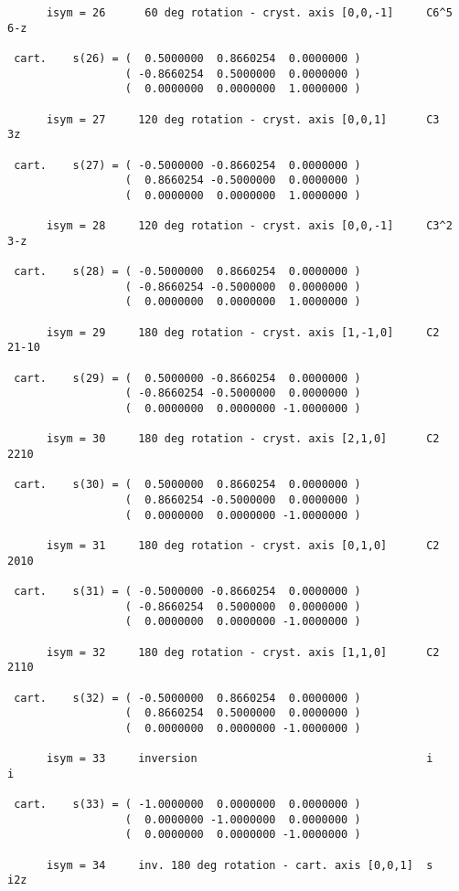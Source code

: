 \documentclass[12pt,a4paper]{article}
\begin{document}
\begin{footnotesize}
\begin{verbatim}
      isym = 26      60 deg rotation - cryst. axis [0,0,-1]     C6^5   6-z

 cart.    s(26) = (  0.5000000  0.8660254  0.0000000 )
                  ( -0.8660254  0.5000000  0.0000000 )
                  (  0.0000000  0.0000000  1.0000000 )

      isym = 27     120 deg rotation - cryst. axis [0,0,1]      C3     3z

 cart.    s(27) = ( -0.5000000 -0.8660254  0.0000000 )
                  (  0.8660254 -0.5000000  0.0000000 )
                  (  0.0000000  0.0000000  1.0000000 )

      isym = 28     120 deg rotation - cryst. axis [0,0,-1]     C3^2   3-z

 cart.    s(28) = ( -0.5000000  0.8660254  0.0000000 )
                  ( -0.8660254 -0.5000000  0.0000000 )
                  (  0.0000000  0.0000000  1.0000000 )

      isym = 29     180 deg rotation - cryst. axis [1,-1,0]     C2     21-10

 cart.    s(29) = (  0.5000000 -0.8660254  0.0000000 )
                  ( -0.8660254 -0.5000000  0.0000000 )
                  (  0.0000000  0.0000000 -1.0000000 )

      isym = 30     180 deg rotation - cryst. axis [2,1,0]      C2     2210

 cart.    s(30) = (  0.5000000  0.8660254  0.0000000 )
                  (  0.8660254 -0.5000000  0.0000000 )
                  (  0.0000000  0.0000000 -1.0000000 )

      isym = 31     180 deg rotation - cryst. axis [0,1,0]      C2     2010

 cart.    s(31) = ( -0.5000000 -0.8660254  0.0000000 )
                  ( -0.8660254  0.5000000  0.0000000 )
                  (  0.0000000  0.0000000 -1.0000000 )

      isym = 32     180 deg rotation - cryst. axis [1,1,0]      C2     2110

 cart.    s(32) = ( -0.5000000  0.8660254  0.0000000 )
                  (  0.8660254  0.5000000  0.0000000 )
                  (  0.0000000  0.0000000 -1.0000000 )

      isym = 33     inversion                                   i      i

 cart.    s(33) = ( -1.0000000  0.0000000  0.0000000 )
                  (  0.0000000 -1.0000000  0.0000000 )
                  (  0.0000000  0.0000000 -1.0000000 )

      isym = 34     inv. 180 deg rotation - cart. axis [0,0,1]  s      i2z


\end{verbatim}
\end{footnotesize}
\end{document}

